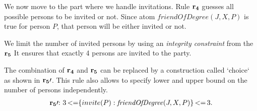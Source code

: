 \documentclass[a4paper, titlepage]{article}
\newcommand{\mi}[1]{\mathit{#1}}
\DeclareMathOperator{\lesseq}{<=}
\newcommand{\row}[1]{%
  \ensuremath{\color{black}\ensuremath{\mathbf{#1}} \color{black}}%
}
\newcommand{\rowprefixprime}[1]{%
  \ensuremath{\color{black}\mathbf{#1\prime{:}}\ }%
}
\begin{document}
We now move to the part where we handle invitations. Rule $\row{r_4}$ guesses all possible 
persons to be invited or not. Since atom 
$\mathit{friendOfDegree(J, X, P)}$ is true for person $P$, that person will be either invited or not.

We limit the number of invited persons by using an 
\emph{integrity constraint} from the $\row{r_5}$
It ensures that exactly 4 persons are invited to the party. 

The combination of $\row{r_4}$ and $\row{r_5}$
can be replaced by a construction called `choice`
as shown in $\row{r_5}\prime$.
This rule also allows to specify lower and upper bound
on the number of persons independently.
\begin{align*}
\rowprefixprime{r_5} 3 \lesseq \{ invite(P) : \mi{friendOfDegree}(J,X,P) \} \lesseq 3.
\end{align*} 
\end{document}
